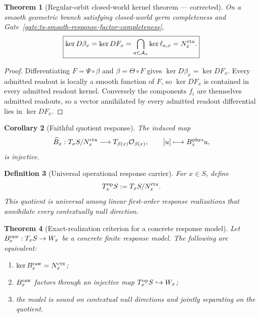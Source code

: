 \documentclass[11pt]{article}
\newtheorem{theorem}{Theorem}[section]
\newtheorem{corollary}[theorem]{Corollary}
\newtheorem{definition}[theorem]{Definition}
\theoremstyle{remark}
\begin{document}
\begin{theorem}[Regular-orbit closed-world kernel theorem --- corrected]
\label{thm:regular-stratum-closed-world-kernel}
On a smooth geometric branch satisfying closed-world germ completeness and
Gate~\ref{gate:ts-smooth-response-factor-completeness},
\[
  \boxed{
  \ker D\beta_x
  =\ker DF_x
  =\bigcap_{a\in\mathcal A_x}\ker\ell_{a,x}
  =N_x^{\rm ctx}.}
\]
\end{theorem}
\begin{proof}
Differentiating $F=\Psi\circ\beta$ and $\beta=\Theta\circ F$ gives
$\ker D\beta_x=\ker DF_x$.  Every admitted readout is locally a smooth
function of $F$, so $\ker DF_x$ is contained in every admitted readout kernel.
Conversely the components $f_i$ are themselves admitted readouts, so a vector
annihilated by every admitted readout differential lies in $\ker DF_x$.
\end{proof}

\begin{corollary}[Faithful quotient response]
\label{cor:faithful-quotient-response}
The induced map
\[
 \widetilde B_x:T_xS/N_x^{\rm ctx}
 \longrightarrow T_{\beta(x)}\mathcal O_{\beta(x)},
 \qquad [u]\longmapsto B_x^{\rm phys}u,
\]
is injective.
\end{corollary}

\begin{definition}[Universal operational response carrier]
\label{def:universal-operational-response-carrier}
For $x\in S$, define
\[
        T_x^{\rm op}S:=T_xS/N_x^{\rm ctx}.
\]
This quotient is universal among linear first-order response realizations that
annihilate every contextually null direction.
\end{definition}

\begin{theorem}[Exact-realization criterion for a concrete response model]
\label{thm:exact-realization-criterion}
Let $B_x^{\rm raw}:T_xS\to W_x$ be a concrete finite response model.  The
following are equivalent:
\begin{enumerate}[label=(\roman*)]
\item $\ker B_x^{\rm raw}=N_x^{\rm ctx}$;
\item $B_x^{\rm raw}$ factors through an injective map
$T_x^{\rm op}S\hookrightarrow W_x$;
\item the model is sound on contextual null directions and jointly separating
on the quotient.
\end{enumerate}
\end{theorem}
\end{document}
